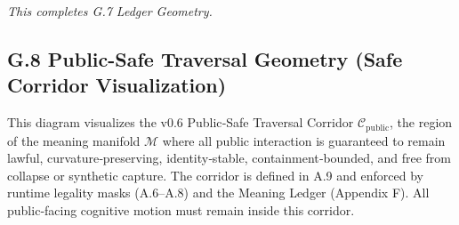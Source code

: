 \medskip

\noindent
\textit{This completes G.7 Ledger Geometry.}



\subsection*{G.8 Public-Safe Traversal Geometry (Safe Corridor Visualization)}

\noindent This diagram visualizes the v0.6 Public‑Safe Traversal Corridor
$\mathcal{C}_{\mathrm{public}}$, the region of the meaning manifold
$\mathcal{M}$ where all public interaction is guaranteed to remain lawful,
curvature‑preserving, identity‑stable, containment‑bounded, and free from
collapse or synthetic capture. The corridor is defined in A.9 and enforced by
runtime legality masks (A.6–A.8) and the Meaning Ledger (Appendix F). All
public‑facing cognitive motion must remain inside this corridor.

